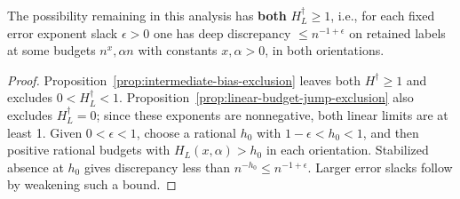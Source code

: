 \begin{corollary}\label{cor:remaining-deep-regime}
The possibility remaining in this analysis has \textbf{both} \(H_L^\dagger\ge1\), i.e., for each fixed error exponent slack \(\epsilon>0\) one has deep discrepancy \(\le n^{-1+\epsilon}\) on retained labels at some budgets \(n^x,\alpha n\) with constants \(x,\alpha>0\), in both orientations.
\end{corollary}

\begin{proof}
Proposition~\ref{prop:intermediate-bias-exclusion} leaves both \(H^\dagger\ge1\) and excludes \(0<H_L^\dagger<1\). Proposition~\ref{prop:linear-budget-jump-exclusion} also excludes \(H_L^\dagger=0\); since these exponents are nonnegative, both linear limits are at least 1. Given \(0<\epsilon<1\), choose a rational \(h_0\) with \(1-\epsilon<h_0<1\), and then positive rational budgets with \(H_L(x,\alpha)>h_0\) in each orientation. Stabilized absence at \(h_0\) gives discrepancy less than \(n^{-h_0}\le n^{-1+\epsilon}\). Larger error slacks follow by weakening such a bound.
\end{proof}
